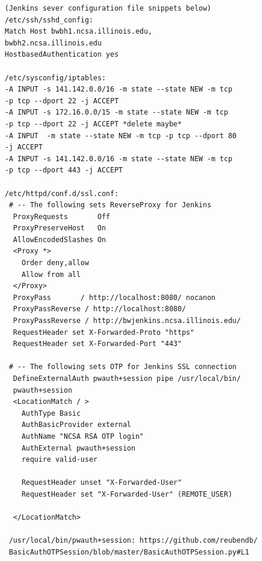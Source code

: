 \documentclass[10pt, conference, compsocconf]{IEEEtran}
\begin{document}
\begin{lstlisting}
(Jenkins sever configuration file snippets below)
/etc/ssh/sshd_config:
Match Host bwbh1.ncsa.illinois.edu,
bwbh2.ncsa.illinois.edu
HostbasedAuthentication yes

/etc/sysconfig/iptables:
-A INPUT -s 141.142.0.0/16 -m state --state NEW -m tcp 
-p tcp --dport 22 -j ACCEPT
-A INPUT -s 172.16.0.0/15 -m state --state NEW -m tcp 
-p tcp --dport 22 -j ACCEPT *delete maybe*
-A INPUT  -m state --state NEW -m tcp -p tcp --dport 80 
-j ACCEPT
-A INPUT -s 141.142.0.0/16 -m state --state NEW -m tcp 
-p tcp --dport 443 -j ACCEPT

/etc/httpd/conf.d/ssl.conf:
 # -- The following sets ReverseProxy for Jenkins
  ProxyRequests       Off
  ProxyPreserveHost   On
  AllowEncodedSlashes On
  <Proxy *>
    Order deny,allow
    Allow from all
  </Proxy>
  ProxyPass       / http://localhost:8080/ nocanon
  ProxyPassReverse / http://localhost:8080/
  ProxyPassReverse / http://bwjenkins.ncsa.illinois.edu/
  RequestHeader set X-Forwarded-Proto "https"
  RequestHeader set X-Forwarded-Port "443"

 # -- The following sets OTP for Jenkins SSL connection
  DefineExternalAuth pwauth+session pipe /usr/local/bin/
  pwauth+session
  <LocationMatch / > 
    AuthType Basic
    AuthBasicProvider external
    AuthName "NCSA RSA OTP login" 
    AuthExternal pwauth+session
    require valid-user
    
    RequestHeader unset "X-Forwarded-User"
    RequestHeader set "X-Forwarded-User" (REMOTE_USER)

  </LocationMatch>
  
 /usr/local/bin/pwauth+session: https://github.com/reubendb/
 BasicAuthOTPSession/blob/master/BasicAuthOTPSession.py#L1
\end{lstlisting}
\end{document}
